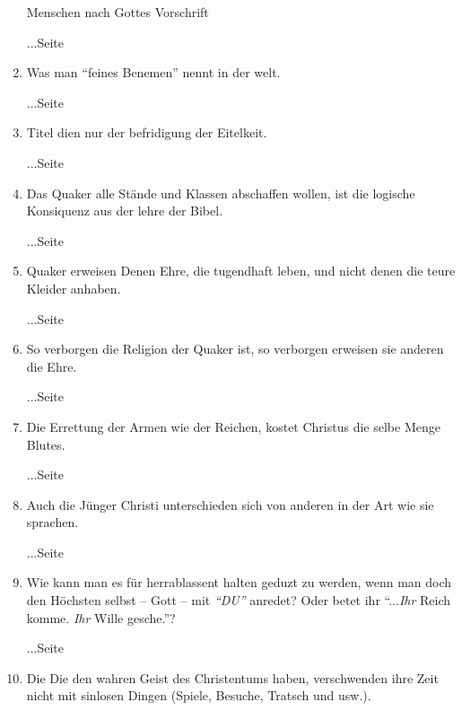 \begin{enumerate}
Menschen nach Gottes Vorschrift
 \begin{flushright}...Seite \pageref{ref:09_20_koenig}\end{flushright}
 \item Was man "`feines Benemen"' nennt in der welt.
 \begin{flushright}...Seite \pageref{ref:09_26_feines_benemen}\end{flushright}
 \item Titel dien nur der befridigung der Eitelkeit.
 \begin{flushright}...Seite \pageref{ref:09_31_heuchelei}\end{flushright}
 \item Das Quaker alle Stände und Klassen abschaffen wollen, ist die logische Konsiquenz aus der lehre der Bibel.
 \begin{flushright}...Seite \pageref{ref:09_35_staende_abschaffen}\end{flushright}
 \item Quaker erweisen Denen Ehre, die tugendhaft leben, und nicht denen die teure Kleider anhaben.
 \begin{flushright}...Seite \pageref{ref:09_36_ehre_erweisen}\end{flushright}
 \item So verborgen die Religion der Quaker ist, so verborgen erweisen sie anderen die Ehre.
 \begin{flushright}...Seite \pageref{ref:09_37_ehre_erweisen}\end{flushright}
 \item Die Errettung der Armen wie der Reichen, kostet Christus die selbe Menge Blutes.
 \begin{flushright}...Seite \pageref{ref:09_39_erettung}\end{flushright}
 \item Auch die Jünger Christi unterschieden sich von anderen in der Art wie sie sprachen.
 \begin{flushright}...Seite \pageref{ref:10_08_sprache}\end{flushright}
 \item Wie kann man es für herrablassent halten geduzt zu werden, wenn man doch den Höchsten selbst -- Gott -- mit \textit{"`DU"'} anredet? Oder betet ihr "`...\textit{Ihr} Reich komme. \textit{Ihr} Wille gesche."'?
 \begin{flushright}...Seite \pageref{ref:10_08_duzen}\end{flushright}
 \item Die Die den wahren Geist des Christentums haben, verschwenden ihre Zeit nicht mit sinlosen Dingen (Spiele, Besuche, Tratsch und usw.).

\end{enumerate}
